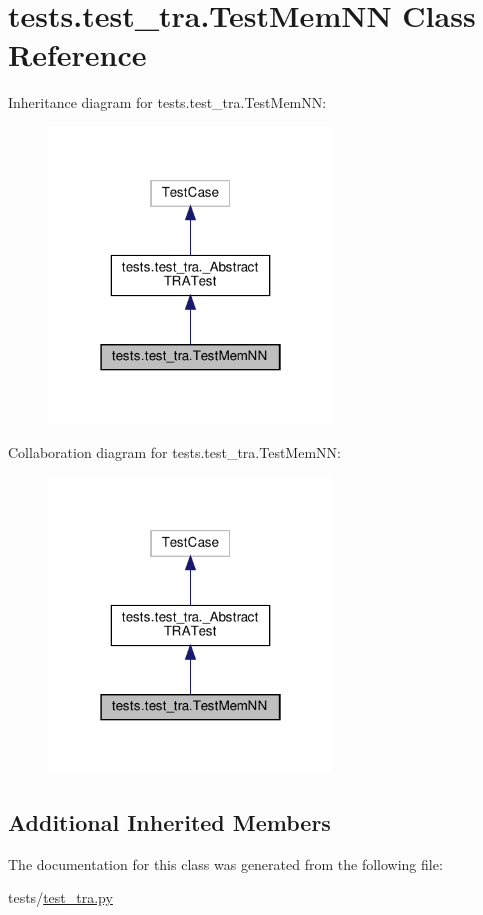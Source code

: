 \hypertarget{classtests_1_1test__tra_1_1TestMemNN}{}\section{tests.\+test\+\_\+tra.\+Test\+Mem\+NN Class Reference}
\label{classtests_1_1test__tra_1_1TestMemNN}


Inheritance diagram for tests.\+test\+\_\+tra.\+Test\+Mem\+NN\+:
\nopagebreak
\begin{figure}[H]
\begin{center}
\leavevmode
\includegraphics[width=214pt]{classtests_1_1test__tra_1_1TestMemNN__inherit__graph}
\end{center}
\end{figure}


Collaboration diagram for tests.\+test\+\_\+tra.\+Test\+Mem\+NN\+:
\nopagebreak
\begin{figure}[H]
\begin{center}
\leavevmode
\includegraphics[width=214pt]{classtests_1_1test__tra_1_1TestMemNN__coll__graph}
\end{center}
\end{figure}
\subsection*{Additional Inherited Members}


The documentation for this class was generated from the following file\+:\begin{DoxyCompactItemize}
\item 
tests/\hyperlink{test__tra_8py}{test\+\_\+tra.\+py}\end{DoxyCompactItemize}
